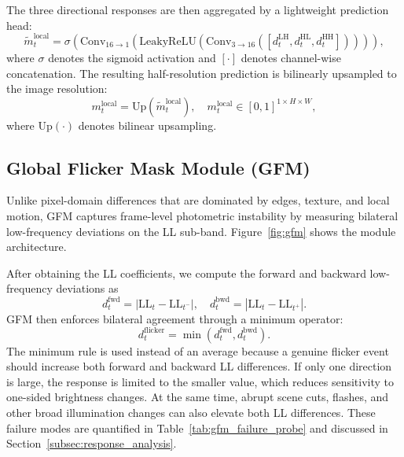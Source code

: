 The three directional responses are then aggregated by a lightweight prediction head:
\begin{equation}\label{eq:local_mask}
    \tilde{m}_t^{\mathrm{local}}=\sigma\!\left(\mathrm{Conv}_{16\to1}\!\left(\mathrm{LeakyReLU}\!\left(\mathrm{Conv}_{3\to16}\!\left([d_t^{\mathrm{LH}},d_t^{\mathrm{HL}},d_t^{\mathrm{HH}}]\right)\right)\right)\right),
\end{equation}
where $\sigma$ denotes the sigmoid activation and $[\cdot]$ denotes channel-wise concatenation. The resulting half-resolution prediction is bilinearly upsampled to the image resolution:
\begin{equation}\label{eq:local_mask_up}
    m_t^{\mathrm{local}}=\mathrm{Up}(\tilde{m}_t^{\mathrm{local}}), \quad m_t^{\mathrm{local}}\in[0,1]^{1\times H\times W},
\end{equation}
where $\mathrm{Up}(\cdot)$ denotes bilinear upsampling.

\subsection{Global Flicker Mask Module (GFM)}\label{subsec:flicker}

Unlike pixel-domain differences that are dominated by edges, texture, and local motion, GFM captures frame-level photometric instability by measuring bilateral low-frequency deviations on the LL sub-band. Figure~\ref{fig:gfm} shows the module architecture.

After obtaining the LL coefficients, we compute the forward and backward low-frequency deviations as
\begin{equation}\label{eq:flicker_diff}
    d_t^{\mathrm{fwd}}=|\mathrm{LL}_t-\mathrm{LL}_{t^-}|,\quad d_t^{\mathrm{bwd}}=|\mathrm{LL}_t-\mathrm{LL}_{t^+}|.
\end{equation}
GFM then enforces bilateral agreement through a minimum operator:
\begin{equation}\label{eq:flicker_min}
    d_t^{\mathrm{flicker}}=\min(d_t^{\mathrm{fwd}},d_t^{\mathrm{bwd}}).
\end{equation}
The minimum rule is used instead of an average because a genuine flicker event should increase both forward and backward LL differences. If only one direction is large, the response is limited to the smaller value, which reduces sensitivity to one-sided brightness changes. At the same time, abrupt scene cuts, flashes, and other broad illumination changes can also elevate both LL differences. These failure modes are quantified in Table~\ref{tab:gfm_failure_probe} and discussed in Section~\ref{subsec:response_analysis}.

